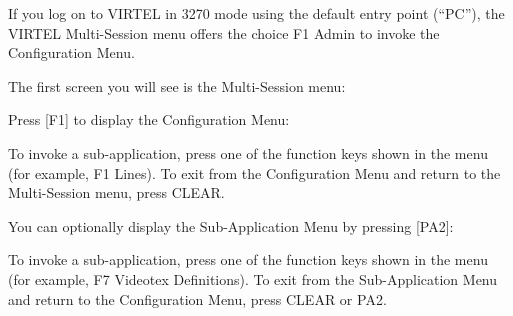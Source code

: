 \documentclass[letterpaper,10pt,english]{sphinxmanual}
\begin{document}
If you log on to VIRTEL in 3270 mode using the default entry point (“PC”), the VIRTEL Multi-Session menu offers the choice F1 \textendash{} Admin to invoke the Configuration Menu.

The first screen you will see is the Multi-Session menu:


Press {[}F1{]} to display the Configuration Menu:


To invoke a sub-application, press one of the function keys shown in the menu (for example, F1 \textendash{} Lines). To exit from the Configuration Menu and return to the Multi-Session menu, press CLEAR.

You can optionally display the Sub-Application Menu by pressing
{[}PA2{]}:


To invoke a sub-application, press one of the function keys shown in the menu (for example, F7 \textendash{} Videotex Definitions). To exit from the Sub-Application Menu and return to the Configuration Menu, press CLEAR or PA2.
\end{document}
